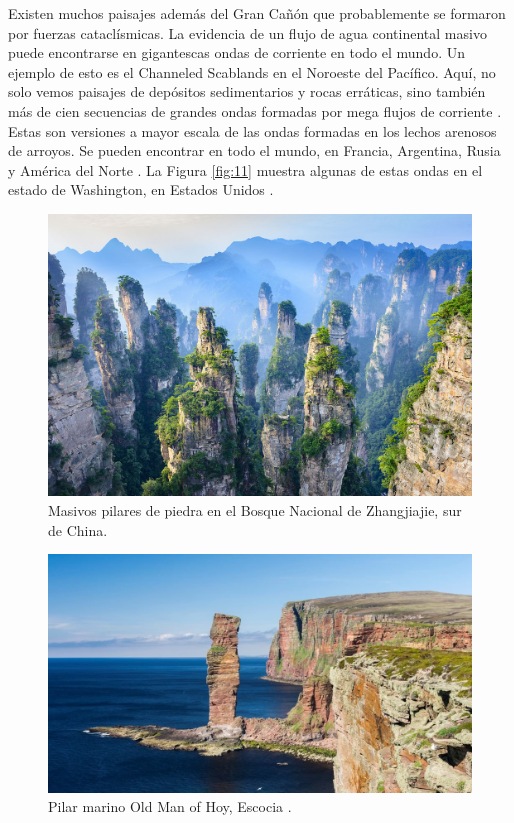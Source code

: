 \documentclass[10pt,twocolumn,letterpaper]{article}
\begin{document}
Existen muchos paisajes además del Gran Cañón que probablemente se formaron por fuerzas cataclísmicas. La evidencia de un flujo de agua continental masivo puede encontrarse en gigantescas ondas de corriente en todo el mundo. Un ejemplo de esto es el Channeled Scablands en el Noroeste del Pacífico. Aquí, no solo vemos paisajes de depósitos sedimentarios y rocas erráticas, sino también más de cien secuencias de grandes ondas formadas por mega flujos de corriente \cite{78,79}. Estas son versiones a mayor escala de las ondas formadas en los lechos arenosos de arroyos. Se pueden encontrar en todo el mundo, en Francia, Argentina, Rusia y América del Norte \cite{81}. La Figura \ref{fig:11} muestra algunas de estas ondas en el estado de Washington, en Estados Unidos \cite{80}.
\begin{figure}[b]
\begin{center}
   \includegraphics[width=1\linewidth]{zhangjiajie.jpg}
\end{center}
   \caption{Masivos pilares de piedra en el Bosque Nacional de Zhangjiajie, sur de China.}
\label{fig:12}
\label{fig:onecol}
\end{figure}

\begin{figure}[b]
\begin{center}
   \includegraphics[width=1\linewidth]{hoy.jpg}
\end{center}
   \caption{Pilar marino Old Man of Hoy, Escocia \cite{83}.}
\label{fig:13}
\label{fig:onecol}
\end{figure}
\end{document}
